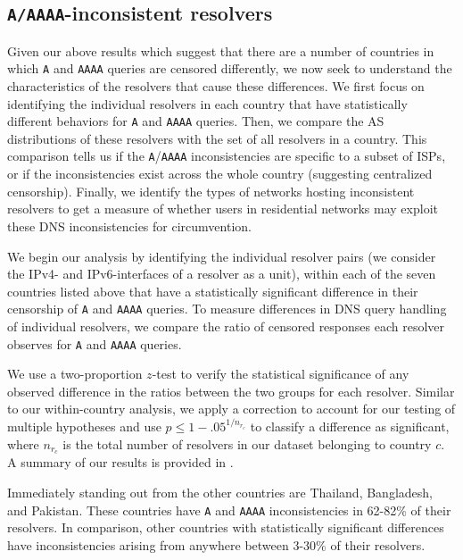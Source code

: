 \subsection{{\tt A/AAAA}-inconsistent resolvers}
\label{sec:resources:resolvers}
Given our above results which suggest that there are a number of countries in
which {\tt A} and {\tt AAAA} queries are censored differently, we now seek to
understand the characteristics of the resolvers that cause these differences.
%
We first focus on identifying the individual resolvers in each country that
have statistically different behaviors for {\tt A} and {\tt AAAA} queries.
Then, we compare the AS distributions of these resolvers with the set of all
resolvers in a country. This comparison tells us if the {\tt A}/{\tt AAAA}
inconsistencies are specific to a subset of ISPs, or if the inconsistencies
exist across the whole country (suggesting centralized censorship).
Finally, we identify the
types of networks hosting inconsistent resolvers to get a measure of whether
users in residential networks may exploit these DNS inconsistencies for
circumvention.

%
We begin our analysis by identifying the individual resolver pairs (\ie we
consider the IPv4- and IPv6-interfaces of a resolver as a unit), within each
of the seven countries listed above that have a statistically significant
difference in their censorship of {\tt A} and {\tt AAAA} queries.
%
To measure differences in DNS query handling of individual resolvers, we
compare the ratio of censored responses each resolver observes for {\tt A} and
{\tt AAAA} queries.

%
We use a two-proportion $z$-test to verify the statistical significance of any
observed difference in the ratios between the two groups for each resolver.
Similar to our within-country analysis, we apply a \Sidak correction to account
for our testing of multiple hypotheses and use $p \leq 1-{.05}^{1/n_{r_c}}$ to
classify a difference as significant, where $n_{r_c}$ is the total number of
resolvers in our dataset belonging to country $c$.
%
A summary of our results is provided in . 

%
Immediately standing out from the other countries are Thailand, Bangladesh, and
Pakistan. These countries have {\tt A} and {\tt AAAA} inconsistencies in
62-82\% of their resolvers. In comparison, other countries with
statistically significant differences have inconsistencies arising from
anywhere between 3-30\% of their resolvers.
%

